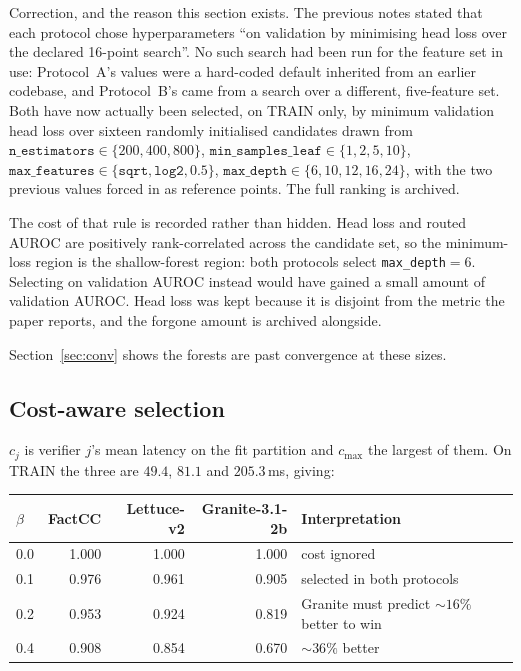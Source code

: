 \documentclass[10pt,a4paper]{article}
\newcommand{\fix}[1]{\textcolor{red!65!black}{#1}}
\begin{document}
\fix{Correction, and the reason this section exists.} The previous notes stated that each protocol
chose hyperparameters ``on validation by minimising head loss over the declared 16-point search''.
No such search had been run for the feature set in use: Protocol~A's values were a hard-coded
default inherited from an earlier codebase, and Protocol~B's came from a search over a different,
five-feature set. Both have now actually been selected, on TRAIN only, by minimum validation head
loss over sixteen randomly initialised candidates drawn from
$\texttt{n\_estimators}\in\{200,400,800\}$, $\texttt{min\_samples\_leaf}\in\{1,2,5,10\}$,
$\texttt{max\_features}\in\{\texttt{sqrt},\texttt{log2},0.5\}$,
$\texttt{max\_depth}\in\{6,10,12,16,24\}$, with the two previous values forced in as reference
points. The full ranking is archived.

\fix{The cost of that rule is recorded rather than hidden.} Head loss and routed AUROC are
positively rank-correlated across the candidate set, so the minimum-loss region is the
shallow-forest region: both protocols select \texttt{max\_depth}$=6$. Selecting on validation
AUROC instead would have gained a small amount of validation AUROC. Head loss was kept because it
is disjoint from the metric the paper reports, and the forgone amount is archived alongside.

Section~\ref{sec:conv} shows the forests are past convergence at these sizes.

\subsection{Cost-aware selection}

$c_j$ is verifier $j$'s mean latency on the fit partition and $c_{\max}$ the largest of them.
On TRAIN the three are \fix{$49.4$, $81.1$ and $205.3$\,ms}, giving:

\begin{center}\small
\begin{tabular}{lrrrl}
\toprule
$\beta$ & FactCC & Lettuce-v2 & Granite-3.1-2b & Interpretation \\
\midrule
0.0 & 1.000 & 1.000 & 1.000 & cost ignored \\
0.1 & 0.976 & 0.961 & 0.905 & selected in both protocols \\
0.2 & 0.953 & 0.924 & 0.819 & Granite must predict ${\sim}16\%$ better to win \\
0.4 & 0.908 & 0.854 & 0.670 & ${\sim}36\%$ better \\
\bottomrule
\end{tabular}
\end{center}
\end{document}
